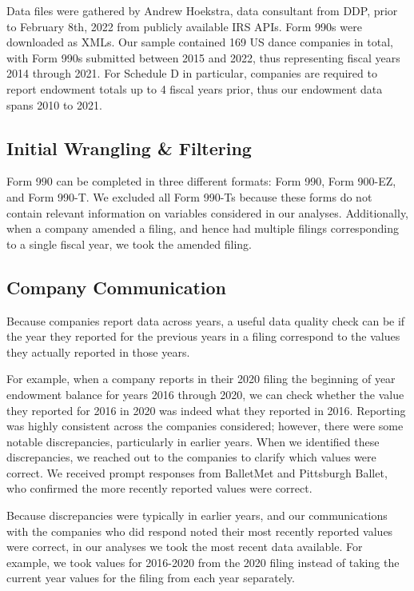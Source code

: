 \documentclass[Dance Data
Project,article,submit,moreauthors,pdftex]{mdpi}
\begin{document}
Data files were gathered by Andrew Hoekstra, data consultant from DDP,
prior to February 8th, 2022 from publicly available IRS APIs. Form 990s
were downloaded as XMLs. Our sample contained 169 US dance companies in
total, with Form 990s submitted between 2015 and 2022, thus representing
fiscal years 2014 through 2021. For Schedule D in particular, companies
are required to report endowment totals up to 4 fiscal years prior, thus
our endowment data spans 2010 to 2021.

\hypertarget{initial-wrangling-filtering}{%
\subsection{Initial Wrangling \&
Filtering}\label{initial-wrangling-filtering}}

Form 990 can be completed in three different formats: Form 990, Form
900-EZ, and Form 990-T. We excluded all Form 990-Ts because these forms
do not contain relevant information on variables considered in our
analyses. Additionally, when a company amended a filing, and hence had
multiple filings corresponding to a single fiscal year, we took the
amended filing.

\hypertarget{company-communication}{%
\subsection{Company Communication}\label{company-communication}}

Because companies report data across years, a useful data quality check
can be if the year they reported for the previous years in a filing
correspond to the values they actually reported in those years.

For example, when a company reports in their 2020 filing the beginning
of year endowment balance for years 2016 through 2020, we can check
whether the value they reported for 2016 in 2020 was indeed what they
reported in 2016. Reporting was highly consistent across the companies
considered; however, there were some notable discrepancies, particularly
in earlier years. When we identified these discrepancies, we reached out
to the companies to clarify which values were correct. We received
prompt responses from BalletMet and Pittsburgh Ballet, who confirmed the
more recently reported values were correct.

Because discrepancies were typically in earlier years, and our
communications with the companies who did respond noted their most
recently reported values were correct, in our analyses we took the most
recent data available. For example, we took values for 2016-2020 from
the 2020 filing instead of taking the current year values for the filing
from each year separately.
\end{document}
